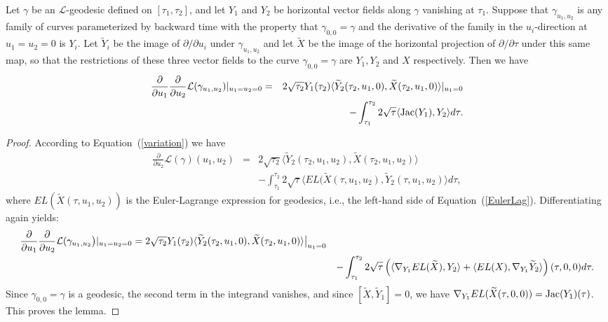 \begin{lemma}\label{lem:l-length-second-variation-formula}
\label{2ndvari}

Let $\gamma$ be an ${\mathcal L}$-geodesic defined on $
[\tau_1,\tau_2]$, and let $Y_1$ and $Y_2$ be horizontal vector
fields along $\gamma$ vanishing at $\tau_1$. Suppose that
$\gamma_{u_1,u_2}$ is any family of curves parameterized by backward
time with the property that $\gamma_{0,0}=\gamma$ and the derivative
of the family in the $u_i$-direction at $u_1=u_2=0$ is $Y_i$. Let
$\widetilde Y_i$ be the image of $\partial/\partial u_i$ under
$\gamma_{u_1,u_2}$ and let $\widetilde X$ be the image of the
horizontal projection of $\partial/\partial \tau$ under this same
map, so that the restrictions of these three vector fields to the
curve $\gamma_{0,0}=\gamma$ are $Y_1,Y_2$ and $X$ respectively. Then
we have \begin{eqnarray*} \frac{\partial}{\partial
u_1}\frac{\partial}{\partial u_2}{\mathcal
L}(\gamma_{u_1,u_2})|_{u_1=u_2=0} & = & 2\sqrt{\tau_2}
Y_1(\tau_2)\langle \widetilde Y_2(\tau_2,u_1,0),\widetilde
X(\tau_2,u_1,0)\rangle|_{u_1=0}\\
& & -\int_{\tau_1}^{\tau_2}2\sqrt{\tau}\langle \operatorname{Jac}(Y_1),Y_2\rangle d\tau.\end{eqnarray*}
\end{lemma}


\begin{proof}
\sketch
{}
According to Equation~(\ref{variation}) we have
\begin{eqnarray*}
\frac{\partial}{\partial u_2}{\mathcal L}(\gamma)(u_1,u_2)
 & = & 2\sqrt{\tau_2}\langle \widetilde Y_2(\tau_2,u_1,u_2),\widetilde
X(\tau_2,u_1,u_2)\rangle
\\ & & -\int_{\tau_1}^{\tau_2}2\sqrt{\tau}\langle EL(\widetilde
X(\tau,u_1,u_2),\widetilde Y_2(\tau,u_1,u_2)\rangle d\tau,\end{eqnarray*} where
$EL(\widetilde X(\tau,u_1,u_2))$ is the Euler-Lagrange expression for
geodesics, i.e., the left-hand side of Equation~(\ref{EulerLag}).
Differentiating again yields:
\begin{eqnarray}
\frac{\partial }{\partial u_1}\frac{\partial }{\partial u_2}{\mathcal
L}(\gamma_{u_1,u_2}\bigl)|_{u_1=u_2=0}\big.
 =  2\sqrt{\tau_2}Y_1(\tau_2)\langle \widetilde
Y_2(\tau_2,u_1,0),\widetilde X(\tau_2,u_1,0)\rangle\bigl|_{u_1=0}\bigr.  \nonumber\\
& & -
\int_{\tau_1}^{\tau_2}2\sqrt{\tau}\left(\langle\nabla_{Y_1}EL(\widetilde
X), Y_2\rangle +\langle EL(X),\nabla_{Y_1}\widetilde
Y_2\rangle\right)(\tau,0,0)d\tau. \label{crosspart} \end{eqnarray}
Since $\gamma_{0,0}=\gamma$ is a geodesic, the second term in the
integrand vanishes, and since $[\widetilde X,\widetilde Y_1]=0$, we
have $\nabla_{Y_1}EL(\widetilde X(\tau,0,0))=\operatorname{Jac}(Y_1)(\tau)$.
This proves the lemma.
\end{proof}

